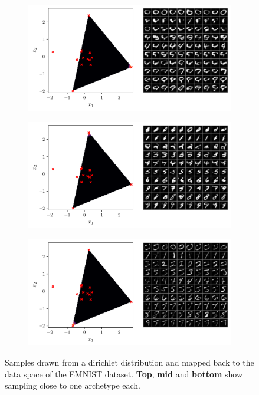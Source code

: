 \begin{figure}[htpb]
	\centering
	\begin{subfigure}[htpb]{\textwidth}
		\centering
		\includegraphics[width=1\linewidth]{figures/samples/aa_emnist1.pdf}
	\end{subfigure}

	\begin{subfigure}[htpb]{\textwidth}
		\centering
		\includegraphics[width=1\linewidth]{figures/samples/aa_emnist2.pdf}
	\end{subfigure}

	\begin{subfigure}[htpb]{\textwidth}
		\centering
		\includegraphics[width=1\linewidth]{figures/samples/aa_emnist3.pdf}
	\end{subfigure}
	\caption{Samples drawn from a dirichlet distribution and mapped back to
		the data space of the EMNIST dataset. \textbf{Top},
                \textbf{mid} and \textbf{bottom} show sampling
		close to one archetype each.}%
	\label{fig:aa_emnist_corners}
\end{figure}

